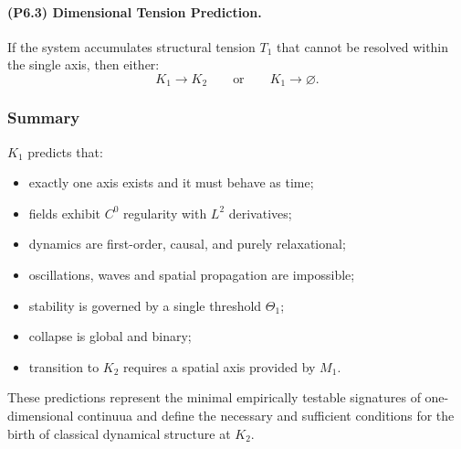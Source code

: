 \paragraph{(P6.3) Dimensional Tension Prediction.}
If the system accumulates structural tension $T_1$ that cannot be resolved
within the single axis, then either:
\[
K_1 \rightarrow K_2
\qquad\text{or}\qquad
K_1 \rightarrow \varnothing.
\]

\subsubsection{Summary}

$K_1$ predicts that:

\begin{itemize}
    \item exactly one axis exists and it must behave as time;
    \item fields exhibit $C^0$ regularity with $L^2$ derivatives;
    \item dynamics are first-order, causal, and purely relaxational;
    \item oscillations, waves and spatial propagation are impossible;
    \item stability is governed by a single threshold $\Theta_1$;
    \item collapse is global and binary;
    \item transition to $K_2$ requires a spatial axis provided by $M_1$.
\end{itemize}

These predictions represent the minimal empirically testable signatures of
one-dimensional continuua and define the necessary and sufficient conditions
for the birth of classical dynamical structure at $K_2$.
